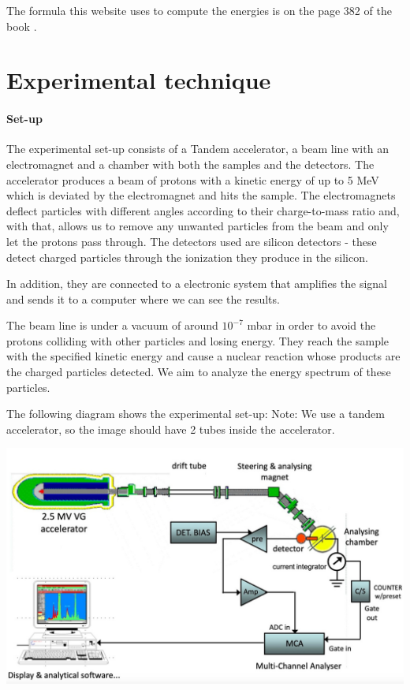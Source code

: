 \documentclass{article}
\begin{document}
\begin{multicols}{2}
The formula this website uses to compute the energies is on the page 382 of the book \cite{krane1988}.

\section{Experimental technique}

\paragraph{Set-up}

The experimental set-up consists of a Tandem accelerator, a beam line with an electromagnet and a chamber with both the samples and the detectors.
The accelerator produces a beam of protons with a kinetic energy of up to 5 MeV which is deviated by the electromagnet and hits the sample. 
The electromagnets deflect particles with different angles according to their charge-to-mass ratio and, with that, allows us to remove any unwanted particles from the beam and only let the protons pass through.
The detectors used are silicon detectors - these detect charged particles through the ionization they produce in the silicon.

In addition, they are connected to a electronic system that amplifies the signal and sends it to a computer where we
can see the results.

The beam line is under a vacuum of around $10^{-7}$ mbar in order to avoid the protons colliding with other particles and losing energy. 
They reach the sample with the specified kinetic energy and cause a nuclear reaction whose products are the charged particles detected.
We aim to analyze the energy spectrum of these particles.

The following diagram shows the experimental set-up:
Note: We use a tandem accelerator, so the image should have 2 tubes inside the accelerator.

\begin{center}
  \includegraphics[width=0.95\linewidth]{../images/scheme.jpeg}
\label{setup}
\end{center}


\end{multicols}
\end{document}
